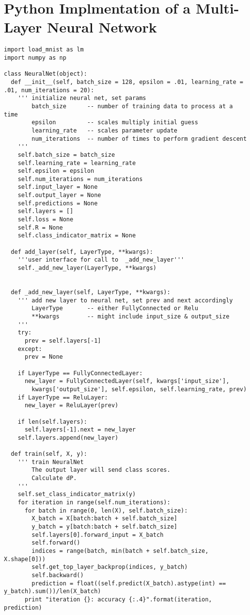 \newpage
\section{Python Implmentation of a Multi-Layer Neural Network}
\begin{verbatim}
import load_mnist as lm
import numpy as np

class NeuralNet(object):
  def __init__(self, batch_size = 128, epsilon = .01, learning_rate = .01, num_iterations = 20):
    ''' initialize neural net, set params
        batch_size      -- number of training data to process at a time
        epsilon         -- scales multiply initial guess
        learning_rate   -- scales parameter update
        num_iterations  -- number of times to perform gradient descent
    '''
    self.batch_size = batch_size
    self.learning_rate = learning_rate
    self.epsilon = epsilon
    self.num_iterations = num_iterations
    self.input_layer = None
    self.output_layer = None
    self.predictions = None
    self.layers = []
    self.loss = None
    self.R = None
    self.class_indicator_matrix = None

  def add_layer(self, LayerType, **kwargs):
    '''user interface for call to  _add_new_layer'''
    self._add_new_layer(LayerType, **kwargs)


  def _add_new_layer(self, LayerType, **kwargs):
    ''' add new layer to neural net, set prev and next accordingly
        LayerType       -- either FullyConnected or Relu
        **kwargs        -- might include input_size & output_size
    '''
    try:
      prev = self.layers[-1]
    except:
      prev = None

    if LayerType == FullyConnectedLayer:
      new_layer = FullyConnectedLayer(self, kwargs['input_size'],
        kwargs['output_size'], self.epsilon, self.learning_rate, prev)
    if LayerType == ReluLayer:
      new_layer = ReluLayer(prev)

    if len(self.layers):
      self.layers[-1].next = new_layer
    self.layers.append(new_layer)

  def train(self, X, y):
    ''' train NeuralNet
        The output layer will send class scores.
        Calculate dP.
    '''
    self.set_class_indicator_matrix(y)
    for iteration in range(self.num_iterations):
      for batch in range(0, len(X), self.batch_size):
        X_batch = X[batch:batch + self.batch_size]
        y_batch = y[batch:batch + self.batch_size]
        self.layers[0].forward_input = X_batch
        self.forward()
        indices = range(batch, min(batch + self.batch_size, X.shape[0]))
        self.get_top_layer_backprop(indices, y_batch)
        self.backward()
        prediction = float((self.predict(X_batch).astype(int) == y_batch).sum())/len(X_batch)
      print "iteration {}: accuracy {:.4}".format(iteration, prediction)
 

\end{verbatim}
